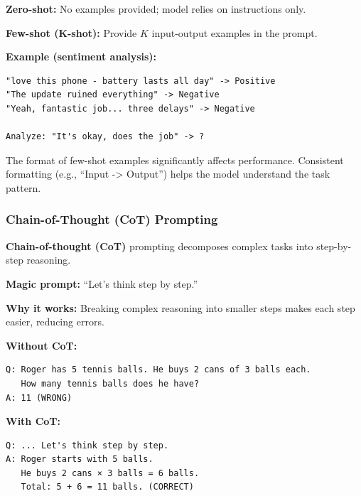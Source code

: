 \begin{defbox}
\textbf{Zero-shot:} No examples provided; model relies on instructions only.

\textbf{Few-shot (K-shot):} Provide $K$ input-output examples in the prompt.

\textbf{Example (sentiment analysis):}
\begin{verbatim}
"love this phone - battery lasts all day" -> Positive
"The update ruined everything" -> Negative
"Yeah, fantastic job... three delays" -> Negative

Analyze: "It's okay, does the job" -> ?
\end{verbatim}
\end{defbox}

\begin{tipbox}
The format of few-shot examples significantly affects performance. Consistent formatting (e.g., ``Input -> Output'') helps the model understand the task pattern.
\end{tipbox}

\bigseparator

\subsubsection{Chain-of-Thought (CoT) Prompting}

\begin{defbox}
\textbf{Chain-of-thought (CoT)} prompting decomposes complex tasks into step-by-step reasoning.

\textbf{Magic prompt:} ``Let's think step by step.''

\textbf{Why it works:} Breaking complex reasoning into smaller steps makes each step easier, reducing errors.
\end{defbox}

\begin{exbox}
\textbf{Without CoT:}
\begin{verbatim}
Q: Roger has 5 tennis balls. He buys 2 cans of 3 balls each.
   How many tennis balls does he have?
A: 11 (WRONG)
\end{verbatim}

\textbf{With CoT:}
\begin{verbatim}
Q: ... Let's think step by step.
A: Roger starts with 5 balls.
   He buys 2 cans × 3 balls = 6 balls.
   Total: 5 + 6 = 11 balls. (CORRECT)
\end{verbatim}
\end{exbox}

